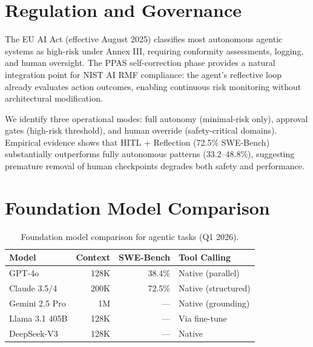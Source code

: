 \documentclass[sn-basic]{sn-jnl}
\theoremstyle{definition}
\begin{document}
\section{Regulation and Governance}\label{sec:governance}

The EU AI Act (effective August 2025) classifies most autonomous agentic systems as high-risk under Annex III, requiring conformity assessments, logging, and human oversight. The PPAS self-correction phase provides a natural integration point for NIST AI RMF compliance: the agent's reflective loop already evaluates action outcomes, enabling continuous risk monitoring without architectural modification.

We identify three operational modes: full autonomy (minimal-risk only), approval gates (high-risk threshold), and human override (safety-critical domains). Empirical evidence shows that HITL + Reflection (72.5\% SWE-Bench) substantially outperforms fully autonomous patterns (33.2--48.8\%), suggesting premature removal of human checkpoints degrades both safety and performance.

\section{Foundation Model Comparison}\label{sec:models}

\begin{table}[ht]
\centering
\caption{Foundation model comparison for agentic tasks (Q1 2026).}
\label{tab:models}
\begin{tabular}{lrrl}
\toprule
\textbf{Model} & \textbf{Context} & \textbf{SWE-Bench} & \textbf{Tool Calling} \\
\midrule
GPT-4o          & 128K   & 38.4\%  & Native (parallel) \\
Claude 3.5/4    & 200K   & 72.5\%  & Native (structured) \\
Gemini 2.5 Pro  & 1M     & ---     & Native (grounding) \\
Llama 3.1 405B  & 128K   & ---     & Via fine-tune \\
DeepSeek-V3     & 128K   & ---     & Native \\
\bottomrule
\end{tabular}
\end{table}

\end{document}
